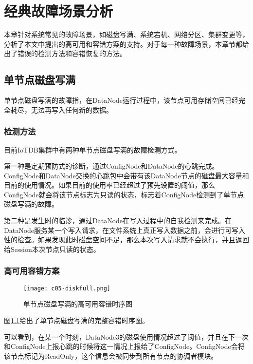 
\chapter{经典故障场景分析}\label{chap-failure-scenarios}

本章针对系统常见的故障场景，如磁盘写满、系统宕机、网络分区、集群变更等，分析了本文中提出的高可用和容错方案的支持。对于每一种故障场景，本章节都给出了错误的检测方法和容错恢复的方法。


\section{单节点磁盘写满}

单节点磁盘写满的故障指，在DataNode运行过程中，该节点可用存储空间已经完全耗尽，无法再写入任何新的数据。

\subsection{检测方法}

目前IoTDB集群中有两种单节点磁盘写满的故障检测方式。

第一种是定期预防式的诊断，通过ConfigNode和DataNode的心跳完成。ConfigNode和DataNode交换的心跳包中会带有该DataNode节点的磁盘最大容量和目前的使用情况。如果目前的使用率已经超过了预先设置的阈值，那么ConfigNode就会将该节点标志为只读的状态，标志着ConfigNode检测到了单节点磁盘写满的故障。

第二种是发生时的临诊，通过DataNode在写入过程中的自我检测来完成。在DataNode服务某一个写入请求，在文件系统上真正写入数据之前，会进行可写入性的检查。如果发现此时磁盘空间不足，那么本次写入请求就不会执行，并且返回给Session本次节点只读的状态。

\subsection{高可用容错方案}

\begin{figure}
    \centering
    \texttt{[image: c05-diskfull.png]}
    \caption{单节点磁盘写满的高可用容错时序图}
    \label{fig:c05-diskfull}
  \end{figure}

图\ref{fig:c05-diskfull}给出了单节点磁盘写满的完整容错时序图。

可以看到，在某一个时刻，DataNode3的磁盘使用情况超过了阈值，并且在下一次和ConfigNode上报心跳的时候将这一情况上报给了ConfigNode。ConfigNode会将该节点标记为ReadOnly，这个信息会被同步到所有节点的协调者模块。

